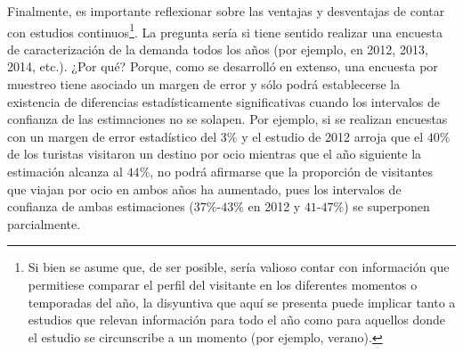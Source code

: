 \documentclass[
]{book}
\begin{document}
Finalmente, es importante reflexionar sobre las ventajas y desventajas de contar con estudios continuos\footnote{Si bien se asume que, de ser posible, sería valioso contar con información que permitiese comparar el perfil del visitante en los diferentes momentos o temporadas del año, la disyuntiva que aquí se presenta puede implicar tanto a estudios que relevan información para todo el año como para aquellos donde el estudio se circunscribe a un momento (por ejemplo, verano).}. La pregunta sería si tiene sentido realizar una encuesta de caracterización de la demanda todos los años (por ejemplo, en 2012, 2013, 2014, etc.). ¿Por qué? Porque, como se desarrolló en extenso, una encuesta por muestreo tiene asociado un margen de error y sólo podrá establecerse la existencia de diferencias estadísticamente significativas cuando los intervalos de confianza de las estimaciones no se solapen. Por ejemplo, si se realizan encuestas con un margen de error estadístico del \(3\%\) y el estudio de 2012 arroja que el \(40\%\) de los turistas visitaron un destino por ocio mientras que el año siguiente la estimación alcanza al \(44\%\), no podrá afirmarse que la proporción de visitantes que viajan por ocio en ambos años ha aumentado, pues los intervalos de confianza de ambas estimaciones (\(37\%\)-\(43\%\) en 2012 y \(41%
\)-\(47\%\)) se superponen parcialmente.
\end{document}
